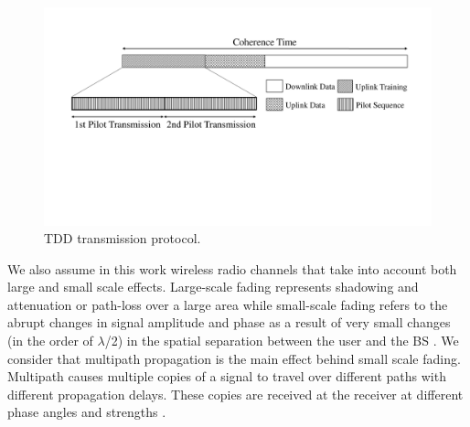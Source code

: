 \documentclass[10pt,journal,comsoc,final]{IEEEtran}
\begin{document}
\begin{figure}[t]
\centering
\includegraphics[trim = 0mm 1mm 0mm 0mm, clip=true, scale=0.3]{cropped_TDD_Protocol_Frame_Structure_v2.pdf}
\caption{TDD transmission protocol.}
\label{fig:tdd_protocol}
\vspace{-6mm}
\end{figure}

We also assume in this work wireless radio channels that take into account both large and small scale effects. Large-scale fading represents shadowing and attenuation or path-loss over a large area while small-scale fading refers to the abrupt changes in signal amplitude and phase as a result of very small changes (in the order of $\lambda$/2) in the spatial separation between the user and the BS \cite{rappaport:wireless_comm}. We consider that multipath propagation is the main effect behind small scale fading. Multipath causes multiple copies of a signal to travel over different paths with different propagation delays. These copies are received at the receiver at different phase angles and strengths \cite{sklar:rayleigh_channels}.
\end{document}
